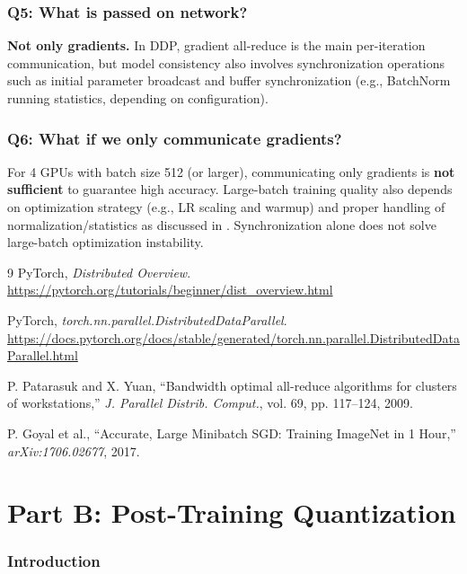 \documentclass[11pt, letterpaper]{article}
\begin{document}
\section{Q5: What is passed on network?}
\textbf{Not only gradients.}  
In DDP, gradient all-reduce is the main per-iteration communication, but model consistency also involves synchronization operations such as initial parameter broadcast and buffer synchronization (e.g., BatchNorm running statistics, depending on configuration).

\section{Q6: What if we only communicate gradients?}
For 4 GPUs with batch size 512 (or larger), communicating only gradients is \textbf{not sufficient} to guarantee high accuracy.  
Large-batch training quality also depends on optimization strategy (e.g., LR scaling and warmup) and proper handling of normalization/statistics as discussed in \cite{goyal2017}. Synchronization alone does not solve large-batch optimization instability.

\begin{thebibliography}{9}
PyTorch, \emph{Distributed Overview}.\\
\url{https://pytorch.org/tutorials/beginner/dist_overview.html}

PyTorch, \emph{torch.nn.parallel.DistributedDataParallel}.\\
\url{https://docs.pytorch.org/docs/stable/generated/torch.nn.parallel.DistributedDataParallel.html}

P. Patarasuk and X. Yuan, ``Bandwidth optimal all-reduce algorithms for clusters of workstations,'' \emph{J. Parallel Distrib. Comput.}, vol. 69, pp. 117--124, 2009.

P. Goyal et al., ``Accurate, Large Minibatch SGD: Training ImageNet in 1 Hour,'' \emph{arXiv:1706.02677}, 2017.
\end{thebibliography}

\newpage
\part{Part B: Post-Training Quantization}
\setcounter{section}{0}


\section{Introduction}
\end{document}

